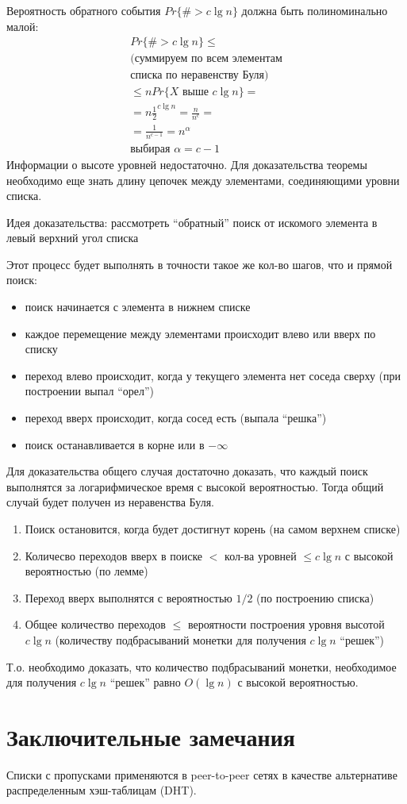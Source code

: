 \documentclass[11pt]{article}
\begin{document}
Вероятность обратного события $Pr\{\# > c\lg n\}$ должна быть полиноминально малой:
\begin{align*}
  Pr\{\# > c \lg n \} \leqslant \\
  \text{(суммируем по всем элементам} \\
  \text{списка по неравенству Буля)} \\
  \leqslant n Pr\{X \text{ выше }c \lg n\} = \\
  = n {\frac{1}{2}}^{c\lg n} = \frac{n}{n^c} = \\
  = \frac{1}{n^{c-1}} = n^\alpha \\
  \text{выбирая }\alpha = c-1
\end{align*}
Информации о высоте уровней недостаточно. Для доказательства теоремы необходимо еще знать длину цепочек между элементами, соединяющими уровни списка.

Идея доказательства: рассмотреть ``обратный'' поиск от искомого элемента в левый верхний угол списка

Этот процесс будет выполнять в точности такое же кол-во шагов, что и прямой поиск:
\begin{itemize}
\item поиск начинается с элемента в нижнем списке
\item каждое перемещение между элементами происходит влево или вверх по списку
\item переход влево происходит, когда у текущего элемента нет соседа сверху (при построении выпал ``орел'')
\item переход вверх происходит, когда сосед есть (выпала ``решка'')
\item поиск останавливается в корне или в $-\infty$
\end{itemize}
Для доказательства общего случая достаточно доказать, что каждый поиск выполнятся за логарифмическое время с высокой вероятностью. Тогда общий случай будет получен из неравенства Буля.
\begin{enumerate}
\item Поиск остановится, когда будет достигнут корень (на самом верхнем списке)
\item Количесво переходов вверх в поиске $<$ кол-ва уровней $\leqslant c \lg n$ с высокой вероятностью (по лемме)
\item Переход вверх выполнятся с вероятностью $1/2$ (по построению списка)
\item Общее количество переходов $\leqslant$ вероятности построения уровня высотой $c \lg n$ (количеству подбрасываний монетки для получения $c \lg n$ ``решек'')
\end{enumerate}
Т.о. необходимо доказать, что количество подбрасываний монетки, необходимое для получения $c \lg n$ ``решек'' равно $O(\lg n)$ с высокой вероятностью.


\section{Заключительные замечания}

Списки с пропусками применяются в peer-to-peer сетях в качестве альтернативе распределенным хэш-таблицам (DHT).
\end{document}
